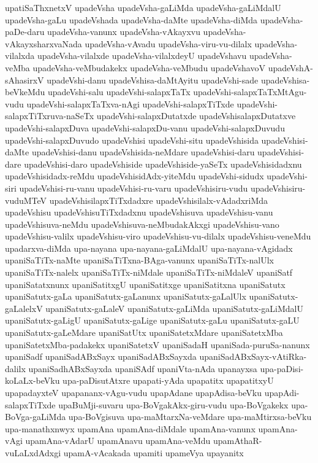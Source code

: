 {upatiSaThxnetxV
upadeVsha
upadeVsha-gaLiMda
upadeVsha-gaLiMdalU
upadeVsha-gaLu
upadeVshada
upadeVsha-daMte
upadeVsha-diMda
upadeVsha-paDe-daru
upadeVsha-vanunx
upadeVsha-vAkayxvu
upadeVsha-vAkayxsharxvaNada
upadeVsha-vAvadu
upadeVsha-viru-vu-dilalx
upadeVsha-vilalxda
upadeVsha-vilalxde
upadeVsha-vilalxdeyU
upadeVshavu
upadeVsha-veMba
upadeVsha-veMbudakekx
upadeVsha-veMbudu
upadeVshavoV
upadeVshA-sAhasirxV
upadeVshi-danu
upadeVshisa-daMtAyitu
upadeVshi-sade
upadeVshisa-beVkeMdu
upadeVshi-salu
upadeVshi-salapxTaTx
upadeVshi-salapxTaTxMtAgu-vudu
upadeVshi-salapxTaTxva-nAgi
upadeVshi-salapxTiTxde
upadeVshi-salapxTiTxruva-naSeTx
upadeVshi-salapxDutatxde
upadeVshisalapxDutatxve
upadeVshi-salapxDuva
upadeVshi-salapxDu-vanu
upadeVshi-salapxDuvudu
upadeVshi-salapxDuvudo
upadeVshisi
upadeVshi-situ
upadeVshisida
upadeVshisi-daMte
upadeVshisi-danu
upadeVshisida-neMdare
upadeVshisi-daru
upadeVshisi-dare
upadeVshisi-daro
upadeVshiside
upadeVshiside-yaSeTx
upadeVshisidadxnu
upadeVshisidadx-reMdu
upadeVshisidAdx-yiteMdu
upadeVshi-sidudx
upadeVshi-siri
upadeVshisi-ru-vanu
upadeVshisi-ru-varu
upadeVshisiru-vudu
upadeVshisiru-vuduMTeV
upadeVshisilapxTiTxdadxre
upadeVshisilalx-vAdadxriMda
upadeVshisu
upadeVshisuTiTxdadxnu
upadeVshisuva
upadeVshisu-vanu
upadeVshisuva-neMdu
upadeVshisuva-neMbudakAkxgi
upadeVshisu-vano
upadeVshisu-valilx
upadeVshisu-viro
upadeVshisu-vu-dilalx
upadeVshisu-veneMdu
upadarxva-diMda
upa-nayana
upa-nayana-gaLiMdalU
upa-nayana-vAgidadx
upaniSaTiTx-naMte
upaniSaTiTxna-BAga-vanunx
upaniSaTiTx-nalUlx
upaniSaTiTx-nalelx
upaniSaTiTx-niMdale
upaniSaTiTx-niMdaleV
upaniSatf
upaniSatatxnunx
upaniSatitxgU
upaniSatitxge
upaniSatitxna
upaniSatutx
upaniSatutx-gaLa
upaniSatutx-gaLanunx
upaniSatutx-gaLalUlx
upaniSatutx-gaLalelxV
upaniSatutx-gaLaleV
upaniSatutx-gaLiMda
upaniSatutx-gaLiMdalU
upaniSatutx-gaLigU
upaniSatutx-gaLige
upaniSatutx-gaLu
upaniSatutx-gaLU
upaniSatutx-gaLeMdare
upaniSatUtx
upaniSatetxMdare
upaniSatetxMba
upaniSatetxMba-padakekx
upaniSatetxV
upaniSadaH
upaniSada-puruSa-nanunx
upaniSadf
upaniSadABxSayx
upaniSadABxSayxda
upaniSadABxSayx-vAtiRka-dalilx
upaniSadhABxSayxda
upaniSAdf
upaniVta-nAda
upanayxsa
upa-paDisi-koLaLx-beVku
upa-paDisutAtxre
upapati-yAda
upapatitx
upapatitxyU
upapadayxteV
upapananx-vAgu-vudu
upapAdane
upapAdisa-beVku
upapAdi-salapxTiTxde
upaBuMji-suvaru
upa-BoVgakAkx-giru-vudu
upa-BoVgakekx
upa-BoVga-gaLiMda
upa-BoVgisuva
upa-maMtarxNa-veMdare
upa-maMtirxsa-beVku
upa-manathxnwyx
upamAna
upamAna-diMdale
upamAna-vanunx
upamAna-vAgi
upamAna-vAdarU
upamAnavu
upamAna-veMdu
upamAthaR-vuLaLxdAdxgi
upamA-vAcakada
upamiti
upameVya
upayanitx
}
